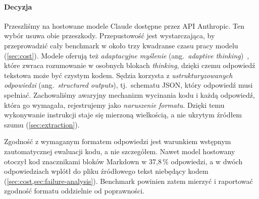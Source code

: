 \paragraph{Decyzja} Przeszliśmy na hostowane modele Claude dostępne przez API Anthropic. Ten wybór
usuwa obie przeszkody. Przepustowość jest wystarczająca, by przeprowadzić cały benchmark w około
trzy kwadranse czasu pracy modelu (\cref{sec:cost}). Modele oferują też \emph{adaptacyjne
myślenie} (ang.~\emph{adaptive thinking})~\cite{anthropic2026docs}, które zwraca rozumowanie
w osobnych blokach \emph{thinking}, dzięki czemu odpowiedź tekstowa może być czystym kodem. Sędzia
korzysta z \emph{ustrukturyzowanych odpowiedzi} (ang.~\emph{structured outputs}), tj.\ schematu
JSON, który odpowiedź musi spełniać. Zachowaliśmy awaryjny mechanizm wycinania kodu i każdą
odpowiedź, która go wymagała, rejestrujemy jako \emph{naruszenie formatu}. Dzięki temu
wykonywanie instrukcji staje się mierzoną wielkością, a nie ukrytym źródłem szumu
(\cref{sec:extraction}).

\begin{findingbox}[Wniosek.]
Zgodność z wymaganym formatem odpowiedzi jest warunkiem wstępnym zautomatycznej ewaluacji kodu, a nie
szczegółem. Nawet model hostowany otoczył kod znacznikami bloków Markdown w 37,8\,\% odpowiedzi,
a w dwóch odpowiedziach wplótł do pliku źródłowego tekst niebędący kodem
(\cref{sec:cost,sec:failure-analysis}). Benchmark powinien zatem mierzyć i raportować zgodność
formatu oddzielnie od poprawności.
\end{findingbox}
